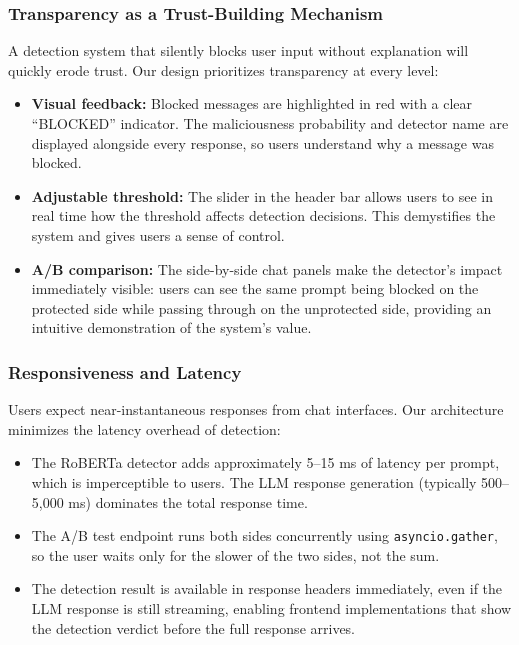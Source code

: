 \documentclass[12pt, letterpaper]{article}   %
\begin{document}
\subsubsection{Transparency as a Trust-Building Mechanism}

A detection system that silently blocks user input without explanation will quickly erode trust. Our design prioritizes transparency at every level:

\begin{itemize}
    \item \textbf{Visual feedback:} Blocked messages are highlighted in red with a clear ``BLOCKED'' indicator. The maliciousness probability and detector name are displayed alongside every response, so users understand why a message was blocked.
    \item \textbf{Adjustable threshold:} The slider in the header bar allows users to see in real time how the threshold affects detection decisions. This demystifies the system and gives users a sense of control.
    \item \textbf{A/B comparison:} The side-by-side chat panels make the detector's impact immediately visible: users can see the same prompt being blocked on the protected side while passing through on the unprotected side, providing an intuitive demonstration of the system's value.
\end{itemize}

\subsubsection{Responsiveness and Latency}

Users expect near-instantaneous responses from chat interfaces. Our architecture minimizes the latency overhead of detection:

\begin{itemize}
    \item The RoBERTa detector adds approximately 5--15 ms of latency per prompt, which is imperceptible to users. The LLM response generation (typically 500--5,000 ms) dominates the total response time.
    \item The A/B test endpoint runs both sides concurrently using \texttt{asyncio.gather}, so the user waits only for the slower of the two sides, not the sum.
    \item The detection result is available in response headers immediately, even if the LLM response is still streaming, enabling frontend implementations that show the detection verdict before the full response arrives.
\end{itemize}
\end{document}
